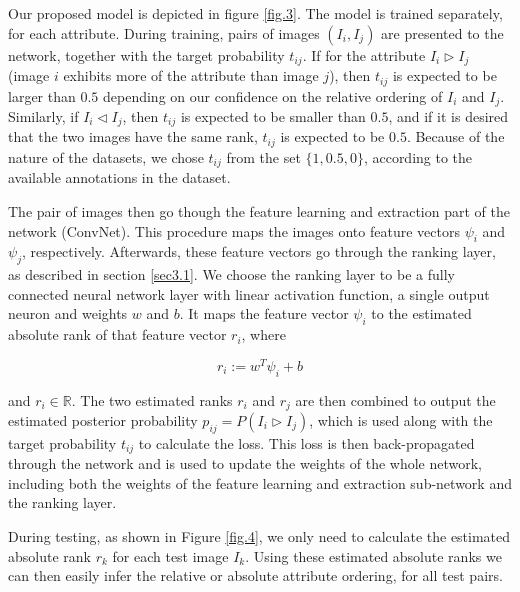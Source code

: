 Our proposed model is depicted in figure \ref{fig.3}. The model is trained separately, for each attribute. During training, pairs of images $(I_i, I_j)$ are presented to the network, together with the target probability $t_{ij}$. If for the attribute $I_i \triangleright I_j$ (image $i$ exhibits more of the attribute than image $j$), then $t_{ij}$ is expected to be larger than $0.5$ depending on our confidence on the relative ordering of $I_i$ and $I_j$. Similarly, if $I_i \triangleleft I_j$, then $t_{ij}$ is expected to be smaller than $0.5$, and if it is desired that the two images have the same rank, $t_{ij}$ is expected to be $0.5$. Because of the nature of the datasets, we chose $t_{ij}$ from the set $\{1, 0.5, 0 \}$, according to the available annotations in the dataset.

The pair of images then go though the feature learning and extraction part of the network (ConvNet). This procedure maps the images %
onto feature vectors $\psi_i$ and $\psi_j$, respectively. Afterwards, these feature vectors go through the ranking layer, as described in section \ref{sec3.1}. We choose the ranking layer to be a fully connected neural network layer with linear activation function, a single output neuron and weights $w$ and $b$. It maps the feature vector $\psi_i$ to the estimated absolute rank of that feature vector $r_i$, where

\begin{equation}
r_i := w^T \psi_i + b
\end{equation}

and $r_i \in \mathbb{R}$.
The two estimated ranks $r_i$ and $r_j$ are then combined to output the estimated posterior probability $ p_{ij} = P(I_i \triangleright I_j)$, %
which is used along with the target probability $t_{ij}$ to calculate the loss. This loss is then back-propagated through the network and is used to update the weights of the whole network, including both the weights of the feature learning and extraction sub-network and the ranking layer.

During testing, %
as shown in Figure \ref{fig.4}, we only need to calculate the estimated absolute rank $r_k$ for each test image $I_k$. Using these estimated absolute ranks we can then easily infer the relative or absolute attribute ordering, for all test pairs.


